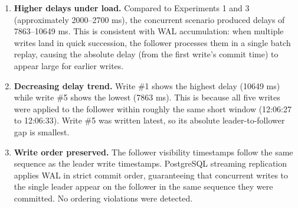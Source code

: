 \documentclass[12pt,a4paper]{article}
\begin{document}
\begin{enumerate}    \item \textbf{Higher delays under load.} Compared to Experiments 1 and 3
        (approximately 2000--2700 ms), the concurrent scenario produced delays
        of 7863--10649 ms. This is consistent with WAL accumulation: when multiple
        writes land in quick succession, the follower processes them in a single
        batch replay, causing the absolute delay (from the first write's
        commit time) to appear large for earlier writes.

    \item \textbf{Decreasing delay trend.} Write \#1 shows the highest delay
        (10649 ms) while write \#5 shows the lowest (7863 ms). This is because all
        five writes were applied to the follower within roughly the same short window
        (12:06:27 to 12:06:33). Write \#5 was written latest, so its absolute
        leader-to-follower gap is smallest.

    \item \textbf{Write order preserved.} The follower visibility timestamps
        follow the same sequence as the leader write timestamps. PostgreSQL
        streaming replication applies WAL in strict commit order, guaranteeing
        that concurrent writes to the single leader appear on the follower in
        the same sequence they were committed. No ordering violations were detected.


\end{enumerate}
\end{document}
